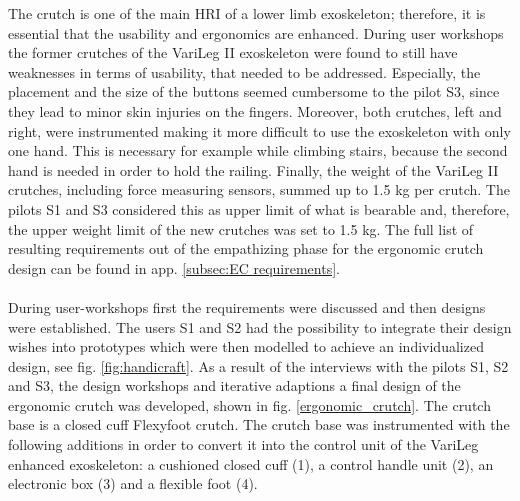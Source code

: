 \documentclass[conference,a4paper]{IEEEtran}
\begin{document}
The crutch is one of the main HRI of a lower limb exoskeleton; therefore, it is essential that the usability and ergonomics are enhanced. During user workshops the former crutches of the VariLeg II exoskeleton were found to still have weaknesses in terms of usability, that needed to be addressed. Especially, the placement and the size of the buttons seemed cumbersome to the pilot S3, since they lead to minor skin injuries on the fingers. Moreover, both crutches, left and right, were instrumented making it more difficult to use the exoskeleton with only one hand. This is necessary for example while climbing stairs, because the second hand is needed in order to hold the railing. Finally, the weight of the VariLeg II crutches, including force measuring sensors, summed up to 1.5 kg per crutch. The pilots S1 and S3 considered this as upper limit of what is bearable and, therefore, the upper weight limit of the new crutches was set to 1.5 kg.
The full list of resulting requirements out of the empathizing phase for the ergonomic crutch design can be found in app. \ref{subsec:EC requirements}. \\
\\
During user-workshops first the requirements were discussed and then designs were established. 
The users S1 and S2 had the possibility to integrate their design wishes into prototypes which were then modelled to achieve an individualized design, see fig. \ref{fig:handicraft}. As a result of the interviews with the pilots S1, S2 and S3, the design workshops and iterative adaptions a final design of the ergonomic crutch was developed, shown in fig. \ref{ergonomic_crutch}. The crutch base is a closed cuff Flexyfoot crutch. The crutch base was instrumented with the following additions in order to convert it into the control unit of the VariLeg enhanced exoskeleton: a cushioned closed cuff (1), a control handle unit (2), an electronic box (3) and a flexible foot (4). \\
\end{document}
